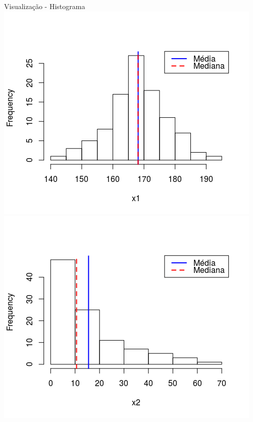 \documentclass{beamer}
\begin{document}
\begin{frame}{Visualização - Histograma}
  \centering
  \includegraphics[width=.5\textwidth]{Cap37-38/normal2-h}
  \includegraphics[width=.5\textwidth]{Cap37-38/lognormal2-h}
\end{frame}
\end{document}
